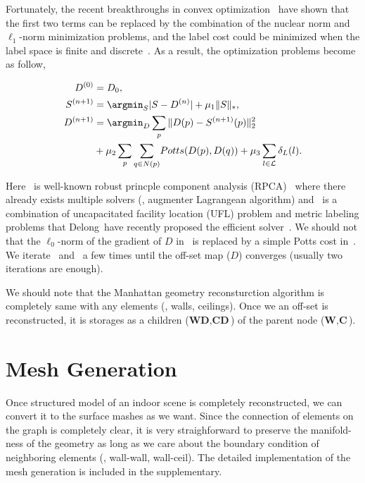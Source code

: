 Fortunately, the recent breakthroughs in convex optimization~\cite{Candes2011} have shown that the first two terms can be replaced by the combination of the nuclear norm and $\ell_1$-norm minimization problems, and the label cost could be minimized when the label space is finite and discrete~\cite{Delong2012}. As a result, the optimization problems become as follow,
{\small
\begin{fleqn}
\begin{align}
D^{(0)} &= D_0, \nonumber\\
S^{(n+1)} &= \argmin_{S}{|S-D^{(n)}| + \mu_1\|S\|_*}, \label{eq:rpca}\\
D^{(n+1)} &= \argmin_{D} \sum_{p}\|D(p)-S^{(n+1)}(p)\|^2_2 \nonumber\\
&+ \mu_2 \sum_p{\sum_{q\in N(p)}}{Potts(D(p), D(q))}+\mu_3\sum_{l\in \mathcal{L}}\delta_L(l).\label{eq:labelcost}
\end{align}
\end{fleqn}
}
Here~ is well-known robust princple component analysis (RPCA)~\cite{Candes2011} where there already exists multiple solvers (\eg, augmenter Lagrangean algorithm) and~ is a combination of uncapacitated facility location (UFL) problem and metric labeling problems that Delong~\etal have recently proposed the efficient solver~\cite{Delong2012}. We should not that the $\ell_0$-norm of the gradient of $D$ in~ is replaced by a simple Potts cost in~. We iterate~ and~ a few times until the off-set map ($D$) converges (usually two iterations are enough).

We should note that the Manhattan geometry reconsturction algorithm is completely same with any elements (\ie, walls, ceilings). Once we an off-set is reconstructed, it is storages as a children ($\textbf{WD}, \textbf{CD}$) of the parent node ($\textbf{W}, \textbf{C}$).
\section{Mesh Generation}
Once structured model of an indoor scene is completely reconstructed, we can convert it to the surface mashes as we want. Since the connection of elements on the graph is completely clear, it is very straighforward to preserve the manifold-ness of the geometry as long as we care about the boundary condition of neighboring elements (\eg, wall-wall, wall-ceil). The detailed implementation of the mesh generation is included in the supplementary. 